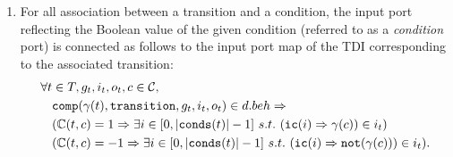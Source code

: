 \begin{definition}
\begin{enumerate}[resume]
    
  \item For all association between a transition and a condition, the
    input port reflecting the Boolean value of the given condition
    (referred to as a \textit{condition} port) is connected as follows
    to the input port map of the TDI corresponding to the associated
    transition:
    \begin{equation*}
      \begin{aligned}[t]
        \forall{}t&\in{}T,g_t,i_t,o_t,c\in\mathcal{C}, \\
                  & \mathtt{comp}(\gamma(t),\mathtt{transition},g_t,i_t,o_t)\in{}d.beh\Rightarrow \\
                  & (\mathbb{C}(t,c)=1\Rightarrow\exists{}i\in[0,\vert\mathtt{conds}(t)\vert-1]~s.t.~(\mathtt{ic}(i)\Rightarrow{}\gamma(c))\in{}i_t) \\
                  & (\mathbb{C}(t,c)=-1\Rightarrow\exists{}i\in[0,\vert\mathtt{conds}(t)\vert-1]~s.t.~(\mathtt{ic}(i)\Rightarrow{}\mathtt{not}(\gamma(c)))\in{}i_t). \\
      \end{aligned}
    \end{equation*}
    

  \end{enumerate}

\end{definition}

